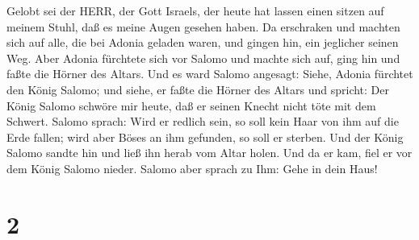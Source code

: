 Gelobt sei der HERR, der Gott Israels, der heute hat lassen einen sitzen
auf meinem Stuhl, daß es meine Augen gesehen haben.  Da
erschraken und machten sich auf alle, die bei Adonia geladen waren, und
gingen hin, ein jeglicher seinen Weg.  Aber Adonia
fürchtete sich vor Salomo und machte sich auf, ging hin und faßte die
Hörner des Altars.  Und es ward Salomo angesagt: Siehe,
Adonia fürchtet den König Salomo; und siehe, er faßte die Hörner des
Altars und spricht: Der König Salomo schwöre mir heute, daß er seinen
Knecht nicht töte mit dem Schwert.  Salomo sprach: Wird er
redlich sein, so soll kein Haar von ihm auf die Erde fallen; wird aber
Böses an ihm gefunden, so soll er sterben.  Und der König
Salomo sandte hin und ließ ihn herab vom Altar holen. Und da er kam,
fiel er vor dem König Salomo nieder. Salomo aber sprach zu Ihm: Gehe in
dein Haus!

\hypertarget{section-1}{%
\section{2}\label{section-1}}

